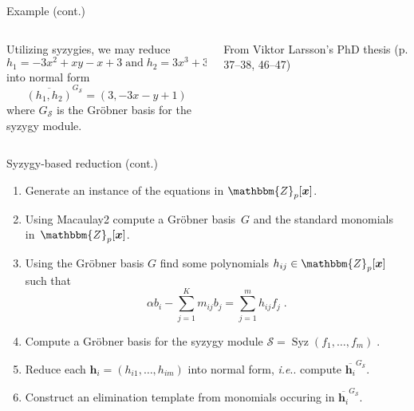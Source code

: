 \documentclass[aspectratio=169]{beamer}
\makeatletter
\newcommand{\mat}[1]{\bm{#1}}
\newcommand{\Z}{\ensuremath{\mathbbm{Z}}}
\DeclareRobustCommand\ie{\emph{i.e}\@ifnextchar.{}{.\@}}
\DeclareMathOperator{\syz}{Syz}
\makeatother
\begin{document}
\begin{frame}[t]{Example (cont.)}
\vspace{3mm}
\begin{columns}
    \begin{column}{0.7\textwidth}
        \begin{minipage}[t][\textheight][t]{\textwidth}
        \vspace{4mm}
        Utilizing syzygies, we may reduce
        \[
            h_1=-3x^2+xy-x+3 \;\text{and}\; h_2 = 3x^3+3xy^2+x-y+1
        \]
        into normal form
        \[
            \overline{(h_1,h_2)}^{G_\mathcal{S}}=(3,-3x-y+1)
        \]
        where $G_\mathcal{S}$ is the Gröbner basis for the syzygy module.
        \end{minipage}
    \end{column}%
    \begin{column}{0.3\textwidth}
        \centering
        

        \vspace{5mm}

        {\scriptsize From Viktor Larsson's PhD thesis (p. 37--38, 46--47)}
    \end{column}
\end{columns}
\end{frame}


\iftrue
\begin{frame}[t]{Syzygy-based reduction (cont.)}
\begin{enumerate}
\item Generate an instance of the equations in $\Z_p[\mat{x}]$.
\item Using Macaulay2 compute a Gröbner basis~$G$ and the standard monomials in~$\Z_p[\mat{x}]$.
\item Using the Gröbner basis $G$ find some polynomials $h_{ij}\in\Z_p[\mat{x}]$ such that
\[
    \alpha b_i- \sum_{j=1}^K m_{ij}b_j = \sum_{j=1}^mh_{ij}f_j\;.
\]
\item Compute a Gröbner basis for the syzygy module
$
    \mathcal{S} = \syz(f_1,\ldots,f_m)\;.
$
\item Reduce each $\mat{h}_i=(h_{i1},\ldots,h_{im})$ into normal form, \ie{} compute $\overline{\mat{h}_i}^{G_{\mathcal{S}}}$.
\item Construct an elimination template from monomials occuring in $\overline{\mat{h}_i}^{G_{\mathcal{S}}}$.
\end{enumerate}
\end{frame}
\fi
\end{document}
